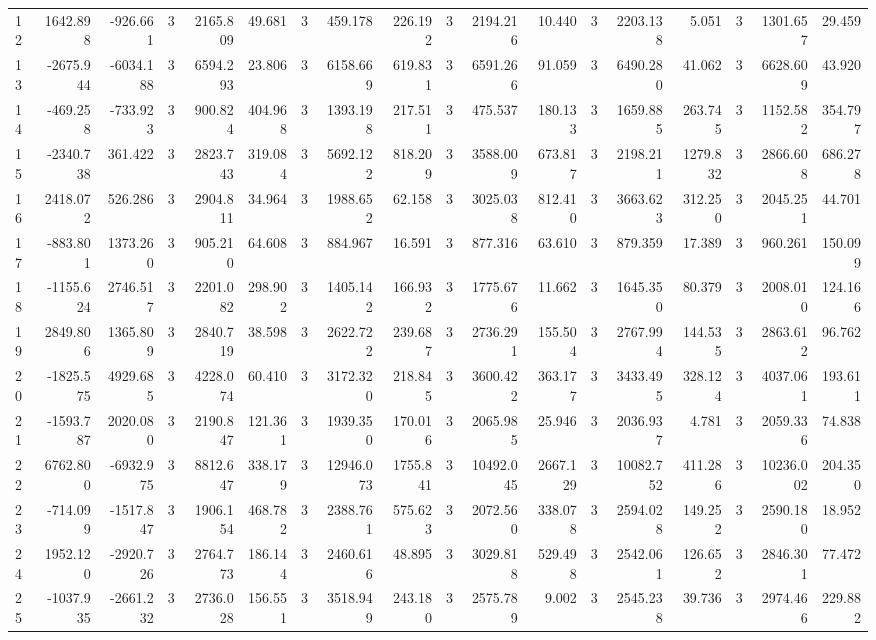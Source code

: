 \begin{table}[ht]
\begin{tabular}{lrrrrrrrrrrrrrrrrr}
12 & 1642.898 & -926.661 & 3 & 2165.809 & 49.681 & 3 & 459.178 & 226.192 & 3 & 2194.216 & 10.440 & 3 & 2203.138 & 5.051 & 3 & 1301.657 & 29.459 \\
13 & -2675.944 & -6034.188 & 3 & 6594.293 & 23.806 & 3 & 6158.669 & 619.831 & 3 & 6591.266 & 91.059 & 3 & 6490.280 & 41.062 & 3 & 6628.609 & 43.920 \\
14 & -469.258 & -733.923 & 3 & 900.824 & 404.968 & 3 & 1393.198 & 217.511 & 3 & 475.537 & 180.133 & 3 & 1659.885 & 263.745 & 3 & 1152.582 & 354.797 \\
15 & -2340.738 & 361.422 & 3 & 2823.743 & 319.084 & 3 & 5692.122 & 818.209 & 3 & 3588.009 & 673.817 & 3 & 2198.211 & 1279.832 & 3 & 2866.608 & 686.278 \\
16 & 2418.072 & 526.286 & 3 & 2904.811 & 34.964 & 3 & 1988.652 & 62.158 & 3 & 3025.038 & 812.410 & 3 & 3663.623 & 312.250 & 3 & 2045.251 & 44.701 \\
17 & -883.801 & 1373.260 & 3 & 905.210 & 64.608 & 3 & 884.967 & 16.591 & 3 & 877.316 & 63.610 & 3 & 879.359 & 17.389 & 3 & 960.261 & 150.099 \\
18 & -1155.624 & 2746.517 & 3 & 2201.082 & 298.902 & 3 & 1405.142 & 166.932 & 3 & 1775.676 & 11.662 & 3 & 1645.350 & 80.379 & 3 & 2008.010 & 124.166 \\
19 & 2849.806 & 1365.809 & 3 & 2840.719 & 38.598 & 3 & 2622.722 & 239.687 & 3 & 2736.291 & 155.504 & 3 & 2767.994 & 144.535 & 3 & 2863.612 & 96.762 \\
20 & -1825.575 & 4929.685 & 3 & 4228.074 & 60.410 & 3 & 3172.320 & 218.845 & 3 & 3600.422 & 363.177 & 3 & 3433.495 & 328.124 & 3 & 4037.061 & 193.611 \\
21 & -1593.787 & 2020.080 & 3 & 2190.847 & 121.361 & 3 & 1939.350 & 170.016 & 3 & 2065.985 & 25.946 & 3 & 2036.937 & 4.781 & 3 & 2059.336 & 74.838 \\
22 & 6762.800 & -6932.975 & 3 & 8812.647 & 338.179 & 3 & 12946.073 & 1755.841 & 3 & 10492.045 & 2667.129 & 3 & 10082.752 & 411.286 & 3 & 10236.002 & 204.350 \\
23 & -714.099 & -1517.847 & 3 & 1906.154 & 468.782 & 3 & 2388.761 & 575.623 & 3 & 2072.560 & 338.078 & 3 & 2594.028 & 149.252 & 3 & 2590.180 & 18.952 \\
24 & 1952.120 & -2920.726 & 3 & 2764.773 & 186.144 & 3 & 2460.616 & 48.895 & 3 & 3029.818 & 529.498 & 3 & 2542.061 & 126.652 & 3 & 2846.301 & 77.472 \\
25 & -1037.935 & -2661.232 & 3 & 2736.028 & 156.551 & 3 & 3518.949 & 243.180 & 3 & 2575.789 & 9.002 & 3 & 2545.238 & 39.736 & 3 & 2974.466 & 229.882 \\

\end{tabular}
\end{table}
